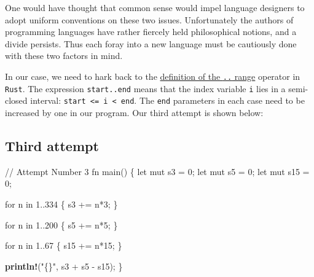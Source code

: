 \documentclass[
  a4paper,
]{article}
\newenvironment{Shaded}{\begin{snugshade}}{\end{snugshade}}
\newcommand{\CommentTok}[1]{\textcolor[rgb]{0.50,0.62,0.50}{#1}}
\newcommand{\ControlFlowTok}[1]{\textcolor[rgb]{0.94,0.87,0.69}{#1}}
\newcommand{\DecValTok}[1]{\textcolor[rgb]{0.86,0.86,0.80}{#1}}
\newcommand{\KeywordTok}[1]{\textcolor[rgb]{0.94,0.87,0.69}{#1}}
\newcommand{\NormalTok}[1]{\textcolor[rgb]{0.80,0.80,0.80}{#1}}
\newcommand{\OperatorTok}[1]{\textcolor[rgb]{0.94,0.94,0.82}{#1}}
\newcommand{\PreprocessorTok}[1]{\textcolor[rgb]{1.00,0.81,0.69}{\textbf{#1}}}
\newcommand{\StringTok}[1]{\textcolor[rgb]{0.80,0.58,0.58}{#1}}
\begin{document}
One would have thought that common sense would impel language designers
to adopt uniform conventions on these two issues. Unfortunately the
authors of programming languages have rather fiercely held philosophical
notions, and a divide persists. Thus each foray into a new language must
be cautiously done with these two factors in mind.

In our case, we need to hark back to the
\href{https://doc.rust-lang.org/reference/expressions/range-expr.html}{definition
of the \texttt{..} range} operator in \texttt{Rust}. The expression
\texttt{start..end} means that the index variable \texttt{i} lies in a
semi-closed interval: \texttt{start\ \textless{}=\ i\ \textless{}\ end}.
The \texttt{end} parameters in each case need to be increased by one in
our program. Our third attempt is shown below:

\hypertarget{third-attempt}{%
\subsection{Third attempt}\label{third-attempt}}

\begin{Shaded}
\begin{Highlighting}[]
 \CommentTok{// Attempt Number 3}
\KeywordTok{fn}\NormalTok{ main() }\OperatorTok{\{}
    \KeywordTok{let} \KeywordTok{mut}\NormalTok{ s3 }\OperatorTok{=} \DecValTok{0}\OperatorTok{;}
    \KeywordTok{let} \KeywordTok{mut}\NormalTok{ s5 }\OperatorTok{=} \DecValTok{0}\OperatorTok{;}
    \KeywordTok{let} \KeywordTok{mut}\NormalTok{ s15 }\OperatorTok{=} \DecValTok{0}\OperatorTok{;}

    \ControlFlowTok{for}\NormalTok{ n }\KeywordTok{in} \DecValTok{1}\OperatorTok{..}\DecValTok{334} \OperatorTok{\{}
\NormalTok{        s3 }\OperatorTok{+=}\NormalTok{ n}\OperatorTok{*}\DecValTok{3}\OperatorTok{;}
    \OperatorTok{\}}

    \ControlFlowTok{for}\NormalTok{ n }\KeywordTok{in} \DecValTok{1}\OperatorTok{..}\DecValTok{200} \OperatorTok{\{}
\NormalTok{        s5 }\OperatorTok{+=}\NormalTok{ n}\OperatorTok{*}\DecValTok{5}\OperatorTok{;}
    \OperatorTok{\}}

    \ControlFlowTok{for}\NormalTok{ n }\KeywordTok{in} \DecValTok{1}\OperatorTok{..}\DecValTok{67} \OperatorTok{\{}
\NormalTok{        s15 }\OperatorTok{+=}\NormalTok{ n}\OperatorTok{*}\DecValTok{15}\OperatorTok{;}
    \OperatorTok{\}}

    \PreprocessorTok{println!}\NormalTok{(}\StringTok{"\{\}"}\OperatorTok{,}\NormalTok{ s3 }\OperatorTok{+}\NormalTok{ s5 }\OperatorTok{{-}}\NormalTok{ s15)}\OperatorTok{;}
\OperatorTok{\}}
\end{Highlighting}
\end{Shaded}
\end{document}
